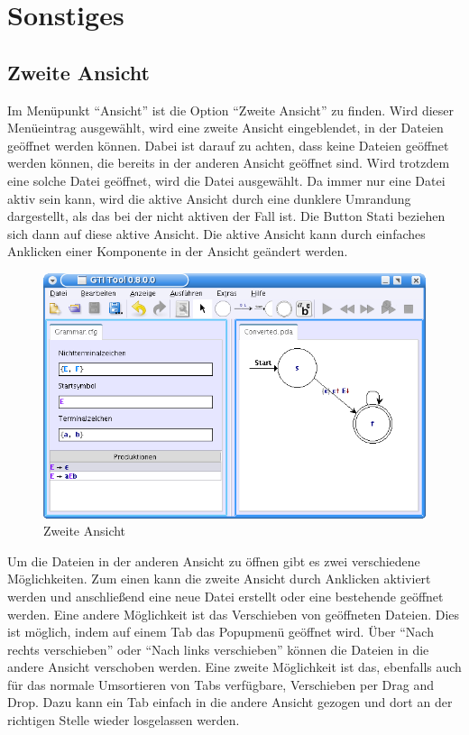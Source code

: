 

\chapter{Sonstiges}


\section{Zweite Ansicht}

Im Menüpunkt "`Ansicht"' ist die Option "`Zweite Ansicht"' zu finden. Wird dieser
Menüeintrag ausgewählt, wird eine zweite Ansicht eingeblendet, in der Dateien
geöffnet werden können. Dabei ist darauf zu achten, dass keine Dateien geöffnet
werden können, die bereits in der anderen Ansicht geöffnet sind. Wird trotzdem
eine solche Datei geöffnet, wird die Datei ausgewählt. Da immer nur eine Datei
aktiv sein kann, wird die aktive Ansicht durch eine dunklere Umrandung
dargestellt, als das bei der nicht aktiven der Fall ist. Die Button Stati
beziehen sich dann auf diese aktive Ansicht. Die aktive Ansicht kann durch
einfaches Anklicken einer Komponente in der Ansicht geändert werden.\vspace{10pt}

\begin{figure}[h]
\begin{center}
\includegraphics[width=12cm]{../images/second_view.png}
\caption{Zweite Ansicht}
\end{center}
\end{figure}

Um die Dateien in der anderen Ansicht zu öffnen gibt es zwei verschiedene
Möglichkeiten. Zum einen kann die zweite Ansicht durch Anklicken aktiviert werden
und anschließend eine neue Datei erstellt oder eine bestehende geöffnet werden.
Eine andere Möglichkeit ist das Verschieben von geöffneten Dateien. Dies ist
möglich, indem auf einem Tab das Popupmenü geöffnet wird. Über "`Nach rechts
verschieben"' oder "`Nach links verschieben"' können die Dateien in die andere
Ansicht verschoben werden. Eine zweite Möglichkeit ist das, ebenfalls auch für
das normale Umsortieren von Tabs verfügbare, Verschieben per Drag and Drop.
Dazu kann ein Tab einfach in die andere Ansicht gezogen und dort an der richtigen
Stelle wieder losgelassen werden.\vspace{10pt}

